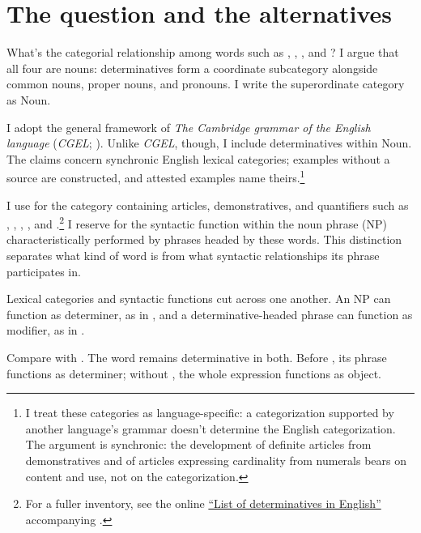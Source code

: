\documentclass[12pt]{article}
\begin{document}
\section{The question and the alternatives}\label{sec:intro}

What's the categorial relationship among words such as , , , and ? I argue that all four are nouns: determinatives form a coordinate subcategory alongside common nouns, proper nouns, and pronouns. I write the superordinate category as Noun.

I adopt the general framework of \textit{The Cambridge grammar of the English language} (\textit{CGEL}; \citealp{huddleston2002}). Unlike \textit{CGEL}, though, I include determinatives within Noun. The claims concern synchronic English lexical categories; examples without a source are constructed, and attested examples name theirs.\footnote{I treat these categories as language-specific: a categorization supported by another language's grammar doesn't determine the English categorization. The argument is synchronic: the development of definite articles from demonstratives and of articles expressing cardinality from numerals \citep[331--336]{lyons1999} bears on content and use, not on the categorization.}

I use  for the category containing articles, demonstratives, and quantifiers such as , , , , and .\footnote{For a fuller inventory, see the online \href{https://www.cambridge.org/highereducation/api/resources/2AC8DF5CA558F8A6FCDFACD0EAF8EA08}{\enquote{List of determinatives in English}} accompanying \textcite{Huddleston2021}.} I reserve  for the syntactic function within the noun phrase (NP) characteristically performed by phrases headed by these words. This distinction separates what kind of word  is from what syntactic relationships its phrase participates in.

Lexical categories and syntactic functions cut across one another. An NP can function as determiner, as in , and a determinative-headed phrase can function as modifier, as in  \citep{payne2010,pullummiller2022nps}.

Compare  with . The word  remains determinative in both. Before , its phrase functions as determiner; without , the whole expression functions as object.
\end{document}
